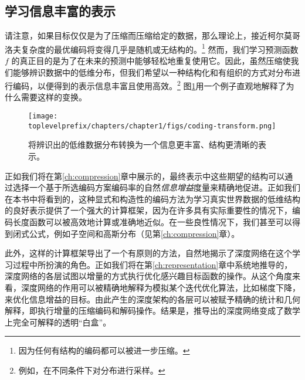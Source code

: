 \documentclass[../../book-main.tex]{subfiles}
\begin{document}
\subsection{学习信息丰富的表示}
请注意，如果目标仅仅是为了压缩而压缩给定的数据，那么理论上，接近柯尔莫哥洛夫复杂度的最优编码将变得几乎是随机或无结构的\cite{Chaitin-1966}。\footnote{因为任何有结构的编码都可以被进一步压缩。} 然而，我们学习预测函数 $f$ 的真正目的是为了在未来的预测中能够轻松地重复使用它。因此，虽然压缩使我们能够辨识数据中的低维分布，但我们希望以一种结构化和有组织的方式对分布进行编码，以便得到的表示信息丰富且使用高效。\footnote{例如，在不同条件下对分布进行采样。} 图\ref{fig:expansion}用一个例子直观地解释了为什么需要这样的变换。

\begin{figure}
    \centering
    \texttt{[image: \\toplevelprefix/chapters/chapter1/figs/coding-transform.png]}
    \caption{将辨识出的低维数据分布转换为一个信息更丰富、结构更清晰的表示。}
    \label{fig:expansion}
\end{figure}
正如我们将在第\ref{ch:compression}章中展示的，最终表示中这些期望的结构可以通过选择一个基于所选编码方案编码率的自然{\em 信息增益}度量来精确地促进。正如我们在本书中将看到的，这种显式和构造性的编码方法为学习真实世界数据的低维结构的良好表示提供了一个强大的计算框架，因为在许多具有实际重要性的情况下，编码长度函数可以被高效地计算或准确地近似。在一些良性情况下，我们甚至可以得到闭式公式，例如子空间和高斯分布（见第\ref{ch:compression}章）。

此外，这样的计算框架导出了一个有原则的方法，自然地揭示了深度网络在这个学习过程中所扮演的角色。正如我们将在第\ref{ch:representation}章中系统地推导的，深度网络的各层试图以增量的方式执行优化感兴趣目标函数的操作。从这个角度来看，深度网络的作用可以被精确地解释为模拟某个迭代优化算法，比如梯度下降，来优化信息增益的目标。由此产生的深度架构的各层可以被赋予精确的统计和几何解释，即执行增量的压缩编码和解码操作。结果是，推导出的深度网络变成了数学上完全可解释的透明“白盒”。



\end{document}
